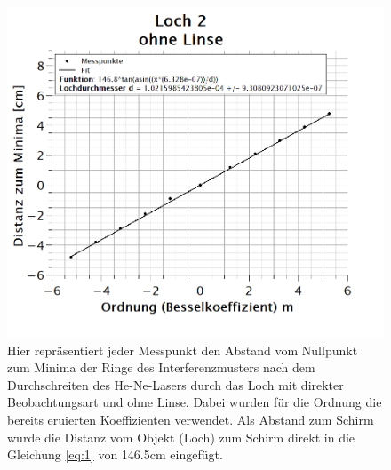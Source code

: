 \begin{figure}[h]
\centering
\includegraphics[width=\textwidth]{Bilder/loch2_ohneLinse.png} 
\caption[Loch 2: ohne Linse]{Hier repräsentiert jeder Messpunkt den Abstand vom Nullpunkt zum Minima der Ringe des Interferenzmusters nach dem Durchschreiten des He-Ne-Lasers durch das Loch mit direkter Beobachtungsart und ohne Linse. Dabei wurden für die Ordnung die bereits eruierten Koeffizienten verwendet. Als Abstand zum Schirm wurde die Distanz vom Objekt (Loch) zum Schirm direkt in die Gleichung \ref{eq:1} von 146.5cm eingefügt.}
\label{fig:loch2_ohneLinse}
\end{figure}
\newpage
